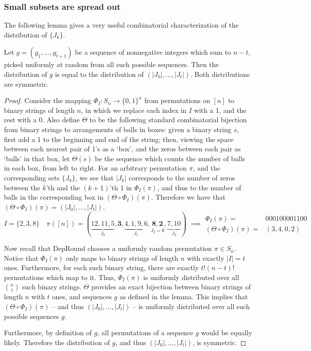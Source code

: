 \subsubsection{Small subsets are spread out}

The following lemma gives a very useful combinatorial characterization of the distribution of $\{J_k\}$.
\begin{lemma}\label{lemma:bijection}
Let $g=(g_1,\dots,g_{t+1})$ be a sequence of nonnegative integers which sum to $n-t$, picked uniformly at random from all such possible sequences. Then the distribution of $g$ is equal to the distribution of $(|J_0|,\dots,|J_t|)$. Both distributions are symmetric.
\end{lemma}
\begin{proof}Consider the mapping $\Phi_I:S_n\to\{0,1\}^n$ from permutations on $[n]$ to binary strings of length $n$, in which we replace each index in $I$ with a 1, and the rest with a 0. Also define $\Theta$ to be the following standard combinatorial bijection from binary strings to arrangements of balls in boxes: given a binary string $s$, first add a 1 to the beginning and end of the string; then, viewing the space between each nearest pair of 1's as a `box', and the zeros between each pair as `balls' in that box, let $\Theta(s)$ be the sequence which counts the number of balls in each box, from left to right. For an arbitrary permutation $\pi$, and the corresponding sets $\{J_k\}$, we see that $|J_k|$ corresponds to the number of zeros between the $k$'th and the $(k+1)$'th 1 in $\Phi_I(\pi)$, and thus to the number of balls in the corresponding box in $(\Theta\circ\Phi_I)(\pi)$. Therefore we have that $(\Theta\circ\Phi_I)(\pi)=(|J_0|,\ldots,|J_t|)$.
\[I=\{2,3,8\}\quad\pi([n])=(\underbrace{12,11,5}_{J_0},\mathbf{3},\underbrace{4,1,9,6}_{J_1},\underset{J_2=\emptyset}{\mathbf{8},\mathbf{2}},\underbrace{7,10}_{J_3})
\;\implies
\begin{array}{rl}
	\Phi_I(\pi)=&000100001100 \\
	(\Theta\circ\Phi_I)(\pi)=&(3,4,0,2)
\end{array}\] 

Now recall that {\sc DepRound} chooses a uniformly random permutation $\pi\in S_n$. Notice that $\Phi_I(\pi)$ only maps to binary strings of length $n$ with exactly $|I|=t$ ones. Furthermore, for each such binary string, there are exactly $t!(n-t)!$ permutations which map to it. Thus, $\Phi_I(\pi)$ is uniformly distributed over all $\binom{n}{t}$ such binary strings. $\Theta$ provides an exact bijection between binary strings of length $n$ with $t$ ones, and sequences $g$ as defined in the lemma. This implies that $(\Theta\circ\Phi_I)(\pi)$ -- and thus $(|J_0|,\ldots,|J_t|)$ -- is uniformly distributed over all such possible sequences $g$. 

Furthermore, by definition of $g$, all permutations of a sequence $g$ would be equally likely. Therefore the distribution of $g$, and thus $(|J_0|,\ldots,|J_t|)$, is symmetric.
\end{proof}

